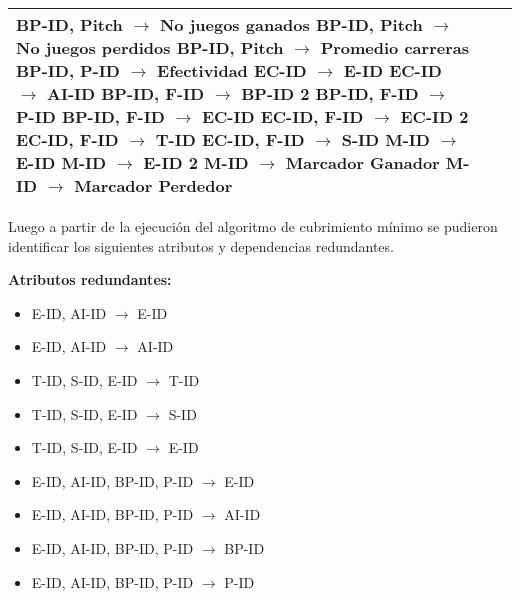 \documentclass{report}
\begin{document}
\begin{tabularx}{\textwidth}{|X|X|X|}
        BP-ID, Pitch $\rightarrow$ No juegos ganados \newline 
        BP-ID, Pitch $\rightarrow$ No juegos perdidos \newline 
        BP-ID, Pitch $\rightarrow$ Promedio carreras \newline 
        BP-ID, P-ID $\rightarrow$ Efectividad \newline 
        EC-ID $\rightarrow$ E-ID \newline 
        EC-ID $\rightarrow$ AI-ID \newline 
        BP-ID, F-ID $\rightarrow$ BP-ID 2 \newline 
        BP-ID, F-ID $\rightarrow$ P-ID \newline 
        BP-ID, F-ID $\rightarrow$ EC-ID \newline 
        EC-ID, F-ID $\rightarrow$ EC-ID 2 \newline 
        EC-ID, F-ID $\rightarrow$ T-ID \newline 
        EC-ID, F-ID $\rightarrow$ S-ID \newline 
        M-ID $\rightarrow$ E-ID \newline 
        M-ID $\rightarrow$ E-ID 2 \newline  
        M-ID $\rightarrow$ Marcador Ganador \newline 
        M-ID $\rightarrow$ Marcador Perdedor \\
        \bottomrule
    \end{tabularx}

    \newpage

    Luego a partir de la ejecución del algoritmo de cubrimiento mínimo se pudieron identificar los siguientes 
    atributos y dependencias redundantes. \newline

    \textbf{Atributos redundantes:}
    \begin{itemize}
        \item E-ID,  AI-ID $\rightarrow$ E-ID
        \item E-ID,  AI-ID $\rightarrow$ AI-ID
        \item T-ID,  S-ID,  E-ID $\rightarrow$ T-ID
        \item T-ID,  S-ID,  E-ID $\rightarrow$ S-ID
        \item T-ID,  S-ID,  E-ID $\rightarrow$ E-ID
        \item E-ID,  AI-ID,  BP-ID,  P-ID $\rightarrow$ E-ID
        \item E-ID,  AI-ID,  BP-ID,  P-ID $\rightarrow$ AI-ID
        \item E-ID,  AI-ID,  BP-ID,  P-ID $\rightarrow$ BP-ID
        \item E-ID,  AI-ID,  BP-ID,  P-ID $\rightarrow$ P-ID
    \end{itemize}
   
\end{document}

